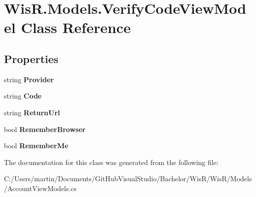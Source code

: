 \hypertarget{class_wis_r_1_1_models_1_1_verify_code_view_model}{}\section{Wis\+R.\+Models.\+Verify\+Code\+View\+Model Class Reference}
\label{class_wis_r_1_1_models_1_1_verify_code_view_model}
\subsection*{Properties}
\begin{DoxyCompactItemize}
\item 
\hypertarget{class_wis_r_1_1_models_1_1_verify_code_view_model_a93fde95b003e40b964cea21ddddb87a3}{}string {\bfseries Provider}\label{class_wis_r_1_1_models_1_1_verify_code_view_model_a93fde95b003e40b964cea21ddddb87a3}

\item 
\hypertarget{class_wis_r_1_1_models_1_1_verify_code_view_model_a4690caec04aba5fd8126044bd5e221ef}{}string {\bfseries Code}\label{class_wis_r_1_1_models_1_1_verify_code_view_model_a4690caec04aba5fd8126044bd5e221ef}

\item 
\hypertarget{class_wis_r_1_1_models_1_1_verify_code_view_model_aa4b12255fac932a24a88ea90da02cd6c}{}string {\bfseries Return\+Url}\label{class_wis_r_1_1_models_1_1_verify_code_view_model_aa4b12255fac932a24a88ea90da02cd6c}

\item 
\hypertarget{class_wis_r_1_1_models_1_1_verify_code_view_model_ad933afd91c757952553fe79552039321}{}bool {\bfseries Remember\+Browser}\label{class_wis_r_1_1_models_1_1_verify_code_view_model_ad933afd91c757952553fe79552039321}

\item 
\hypertarget{class_wis_r_1_1_models_1_1_verify_code_view_model_aaf17e64c667e5b11c65f01e706e6b330}{}bool {\bfseries Remember\+Me}\label{class_wis_r_1_1_models_1_1_verify_code_view_model_aaf17e64c667e5b11c65f01e706e6b330}

\end{DoxyCompactItemize}


The documentation for this class was generated from the following file\+:\begin{DoxyCompactItemize}
\item 
C\+:/\+Users/martin/\+Documents/\+Git\+Hub\+Visual\+Studio/\+Bachelor/\+Wis\+R/\+Wis\+R/\+Models/Account\+View\+Models.\+cs\end{DoxyCompactItemize}
